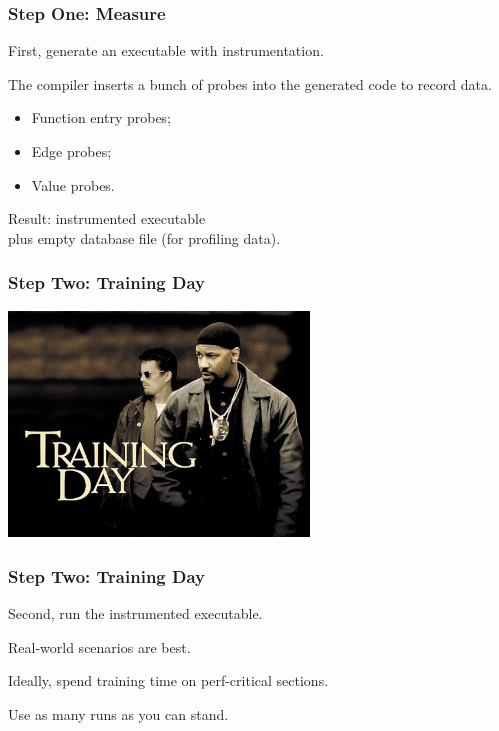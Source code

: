 \begin{frame}
\frametitle{Step One: Measure}

\large
\begin{changemargin}{2cm}
First, generate an executable with instrumentation. 

The compiler inserts a bunch of probes into the generated code to record data. 
\begin{itemize}
\item Function entry probes;
\item Edge probes;
\item Value probes.
\end{itemize}

Result: instrumented executable \\
plus empty database file (for profiling data).
\end{changemargin}

\end{frame}



\begin{frame}
\frametitle{Step Two: Training Day}

\begin{center}
	\includegraphics[width=0.6\textwidth]{images/training-day.jpg}
\end{center}

\end{frame}


\begin{frame}
\frametitle{Step Two: Training Day}
\large
\begin{changemargin}{2cm}

Second, run the instrumented executable.

Real-world scenarios are best.

Ideally, spend training time on perf-critical sections. 

Use as many runs as you can stand.
\end{changemargin}
\end{frame}



